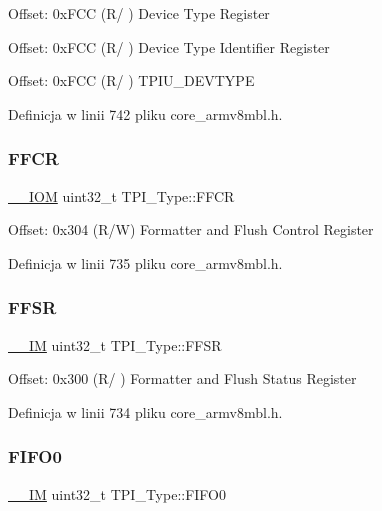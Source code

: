 Offset\+: 0x\+F\+CC (R/ ) Device Type Register

Offset\+: 0x\+F\+CC (R/ ) Device Type Identifier Register

Offset\+: 0x\+F\+CC (R/ ) T\+P\+I\+U\+\_\+\+D\+E\+V\+T\+Y\+PE 

Definicja w linii 742 pliku core\+\_\+armv8mbl.\+h.

\mbox{\label{struct_t_p_i___type_a3f68b6e73561b4849ebf953a894df8d2}} 
\subsubsection{\texorpdfstring{F\+F\+CR}{FFCR}}
{\footnotesize\ttfamily \hyperlink{core__sc300_8h_ab6caba5853a60a17e8e04499b52bf691}{\+\_\+\+\_\+\+I\+OM} uint32\+\_\+t T\+P\+I\+\_\+\+Type\+::\+F\+F\+CR}

Offset\+: 0x304 (R/W) Formatter and Flush Control Register 

Definicja w linii 735 pliku core\+\_\+armv8mbl.\+h.

\mbox{\label{struct_t_p_i___type_a6c47a0b4c7ffc66093ef993d36bb441c}} 
\subsubsection{\texorpdfstring{F\+F\+SR}{FFSR}}
{\footnotesize\ttfamily \hyperlink{core__sc300_8h_a4cc1649793116d7c2d8afce7a4ffce43}{\+\_\+\+\_\+\+IM} uint32\+\_\+t T\+P\+I\+\_\+\+Type\+::\+F\+F\+SR}

Offset\+: 0x300 (R/ ) Formatter and Flush Status Register 

Definicja w linii 734 pliku core\+\_\+armv8mbl.\+h.

\mbox{\label{struct_t_p_i___type_aa4d7b5cf39dff9f53bf7f69bc287a814}} 
\subsubsection{\texorpdfstring{F\+I\+F\+O0}{FIFO0}}
{\footnotesize\ttfamily \hyperlink{core__sc300_8h_a4cc1649793116d7c2d8afce7a4ffce43}{\+\_\+\+\_\+\+IM} uint32\+\_\+t T\+P\+I\+\_\+\+Type\+::\+F\+I\+F\+O0}

